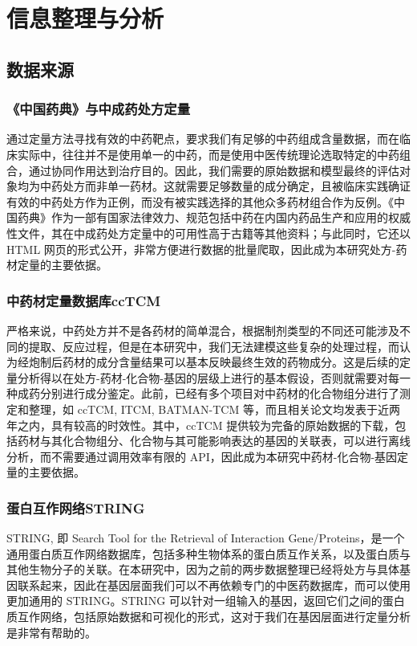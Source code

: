 
\chapter{信息整理与分析}

\section{数据来源}

\subsection{《中国药典》与中成药处方定量}

通过定量方法寻找有效的中药靶点，要求我们有足够的中药组成含量数据，而在临床实际中，往往并不是使用单一的中药，而是使用中医传统理论选取特定的中药组合，通过协同作用达到治疗目的。因此，我们需要的原始数据和模型最终的评估对象均为中药处方而非单一药材。这就需要足够数量的成分确定，且被临床实践确证有效的中药处方作为正例，而没有被实践选择的其他众多药材组合作为反例。《中国药典》作为一部有国家法律效力、规范包括中药在内国内药品生产和应用的权威性文件，其在中成药处方定量中的可用性高于古籍等其他资料；与此同时，它还以 HTML 网页的形式公开，非常方便进行数据的批量爬取，因此成为本研究处方-药材定量的主要依据。

\subsection{中药材定量数据库ccTCM}

严格来说，中药处方并不是各药材的简单混合，根据制剂类型的不同还可能涉及不同的提取、反应过程，但是在本研究中，我们无法建模这些复杂的处理过程，而认为经炮制后药材的成分含量结果可以基本反映最终生效的药物成分。这是后续的定量分析得以在处方-药材-化合物-基因的层级上进行的基本假设，否则就需要对每一种成药分别进行成分鉴定。此前，已经有多个项目对中药材的化合物组分进行了测定和整理，如 ccTCM, ITCM, BATMAN-TCM 等，而且相关论文均发表于近两年之内，具有较高的时效性。其中，ccTCM 提供较为完备的原始数据的下载，包括药材与其化合物组分、化合物与其可能影响表达的基因的关联表，可以进行离线分析，而不需要通过调用效率有限的 API，因此成为本研究中药材-化合物-基因定量的主要依据。

\subsection{蛋白互作网络STRING}

STRING, 即 Search Tool for the Retrieval of Interaction Gene/Proteins，是一个通用蛋白质互作网络数据库，包括多种生物体系的蛋白质互作关系，以及蛋白质与其他生物分子的关联。在本研究中，因为之前的两步数据整理已经将处方与具体基因联系起来，因此在基因层面我们可以不再依赖专门的中医药数据库，而可以使用更加通用的 STRING。STRING 可以针对一组输入的基因，返回它们之间的蛋白质互作网络，包括原始数据和可视化的形式，这对于我们在基因层面进行定量分析是非常有帮助的。

